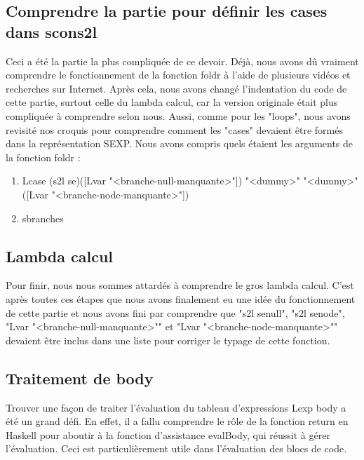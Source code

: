 \documentclass[12pt, a4paper]{article}
\begin{document}
\subsection{Comprendre la partie pour définir les cases dans scons2l}
Ceci a été la partie la plus compliquée de ce devoir. Déjà, nous avons dû vraiment comprendre le fonctionnement de la fonction foldr à l'aide de plusieurs vidéos et recherches sur Internet. Après cela, nous avons changé l'indentation du code de cette partie, surtout celle du lambda calcul, car la version originale était plus compliquée à comprendre selon nous. Aussi, comme pour les "loops", nous avons revisité nos croquis pour comprendre comment les "cases" devaient être formés dans la représentation SEXP. Nous avons compris quels étaient les arguments de la fonction foldr :
\begin{enumerate}
\item Lcase (s2l se)([Lvar "<branche-null-manquante>"]) "<dummy>" "<dummy>" ([Lvar "<branche-node-manquante>"])
\item sbranches
\end{enumerate}
\subsection{Lambda calcul}
Pour finir, nous nous sommes attardés à comprendre le gros lambda calcul. C'est après toutes ces étapes que nous avons finalement eu une idée du fonctionnement de cette partie et nous avons fini par comprendre que "s2l senull", "s2l senode", "Lvar "<branche-null-manquante>"" et "Lvar "<branche-node-manquante>"" devaient être inclus dans une liste pour corriger le typage de cette fonction.
\subsection{Traitement de body}
Trouver une façon de traiter l'évaluation du tableau d'expressions Lexp body a été un grand défi. En effet, il a fallu comprendre le rôle de la fonction return en Haskell pour aboutir à la fonction d'assistance evalBody, qui réussit à gérer l'évaluation. Ceci est particulièrement utile dans l'évaluation des blocs de code.
\end{document}
